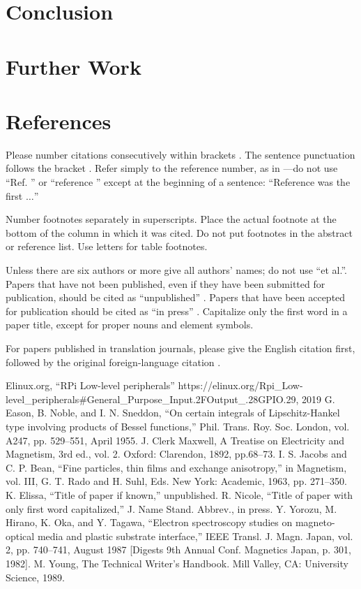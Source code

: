 \documentclass[conference]{IEEEtran}
\begin{document}
\section{Conclusion}



\section{Further Work}




\section*{References}

Please number citations consecutively within brackets \cite{b1}. The 
sentence punctuation follows the bracket \cite{b2}. Refer simply to the reference 
number, as in \cite{b3}---do not use ``Ref. \cite{b3}'' or ``reference \cite{b3}'' except at 
the beginning of a sentence: ``Reference \cite{b3} was the first $\ldots$''

Number footnotes separately in superscripts. Place the actual footnote at 
the bottom of the column in which it was cited. Do not put footnotes in the 
abstract or reference list. Use letters for table footnotes.

Unless there are six authors or more give all authors' names; do not use 
``et al.''. Papers that have not been published, even if they have been 
submitted for publication, should be cited as ``unpublished'' \cite{b4}. Papers 
that have been accepted for publication should be cited as ``in press'' \cite{b5}. 
Capitalize only the first word in a paper title, except for proper nouns and 
element symbols.

For papers published in translation journals, please give the English 
citation first, followed by the original foreign-language citation \cite{b6}.

\begin{thebibliography}{00}
 Elinux.org, ``RPi Low-level peripherals'' https://elinux.org/Rpi\_Low-level\_peripherals\#General\_Purpose\_Input.2FOutput\_.28GPIO.29, 2019
 G. Eason, B. Noble, and I. N. Sneddon, ``On certain integrals of Lipschitz-Hankel type involving products of Bessel functions,'' Phil. Trans. Roy. Soc. London, vol. A247, pp. 529--551, April 1955.
 J. Clerk Maxwell, A Treatise on Electricity and Magnetism, 3rd ed., vol. 2. Oxford: Clarendon, 1892, pp.68--73.
 I. S. Jacobs and C. P. Bean, ``Fine particles, thin films and exchange anisotropy,'' in Magnetism, vol. III, G. T. Rado and H. Suhl, Eds. New York: Academic, 1963, pp. 271--350.
 K. Elissa, ``Title of paper if known,'' unpublished.
 R. Nicole, ``Title of paper with only first word capitalized,'' J. Name Stand. Abbrev., in press.
 Y. Yorozu, M. Hirano, K. Oka, and Y. Tagawa, ``Electron spectroscopy studies on magneto-optical media and plastic substrate interface,'' IEEE Transl. J. Magn. Japan, vol. 2, pp. 740--741, August 1987 [Digests 9th Annual Conf. Magnetics Japan, p. 301, 1982].
 M. Young, The Technical Writer's Handbook. Mill Valley, CA: University Science, 1989.
\end{thebibliography}
\end{document}
